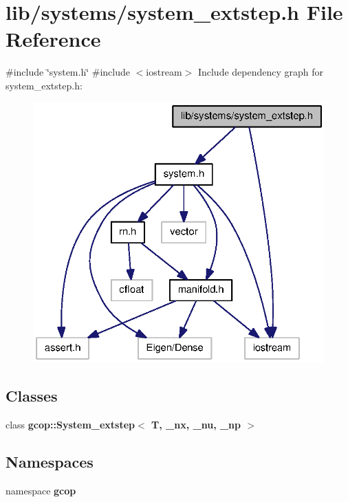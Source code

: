 \section{lib/systems/system\-\_\-extstep.h \-File \-Reference}
\label{system__extstep_8h}
{\ttfamily \#include \char`\"{}system.\-h\char`\"{}}\*
{\ttfamily \#include $<$iostream$>$}\*
\-Include dependency graph for system\-\_\-extstep.\-h\-:
\nopagebreak
\begin{figure}[H]
\begin{center}
\leavevmode
\includegraphics[width=328pt]{system__extstep_8h__incl}
\end{center}
\end{figure}
\subsection*{\-Classes}
\begin{DoxyCompactItemize}
\item 
class {\bf gcop\-::\-System\-\_\-extstep$<$ T, \-\_\-nx, \-\_\-nu, \-\_\-np $>$}
\end{DoxyCompactItemize}
\subsection*{\-Namespaces}
\begin{DoxyCompactItemize}
\item 
namespace {\bf gcop}
\end{DoxyCompactItemize}
